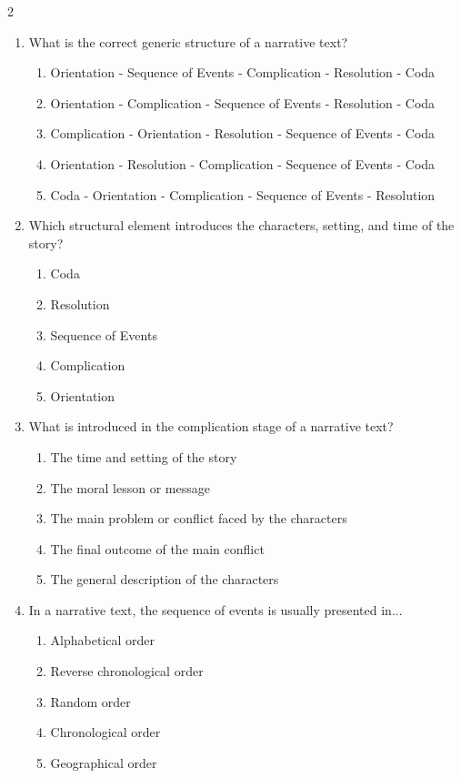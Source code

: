 \documentclass[10pt,a4paper]{article}
\begin{document}
\begin{multicols}{2}
\begin{enumerate}
    \item What is the correct generic structure of a narrative text?
    \begin{enumerate}
      \item Orientation - Sequence of Events - Complication - Resolution - Coda
      \item Orientation - Complication - Sequence of Events - Resolution - Coda
      \item Complication - Orientation - Resolution - Sequence of Events - Coda
      \item Orientation - Resolution - Complication - Sequence of Events - Coda
      \item Coda - Orientation - Complication - Sequence of Events - Resolution
    \end{enumerate}

    \item Which structural element introduces the characters, setting, and time of the story?
    \begin{enumerate}
      \item Coda
      \item Resolution
      \item Sequence of Events
      \item Complication
      \item Orientation
    \end{enumerate}

    \item What is introduced in the complication stage of a narrative text?
    \begin{enumerate}
      \item The time and setting of the story
      \item The moral lesson or message
      \item The main problem or conflict faced by the characters
      \item The final outcome of the main conflict
      \item The general description of the characters
    \end{enumerate}

    \item In a narrative text, the sequence of events is usually presented in...
    \begin{enumerate}
      \item Alphabetical order
      \item Reverse chronological order
      \item Random order
      \item Chronological order
      \item Geographical order
    \end{enumerate}


\end{enumerate}
\end{multicols}
\end{document}
